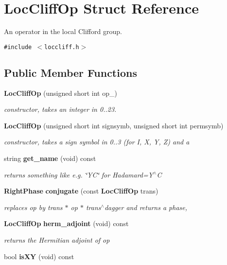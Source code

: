 \section{Loc\-Cliff\-Op Struct Reference}
\label{structLocCliffOp}
An operator in the local Clifford group.  


{\tt \#include $<$loccliff.h$>$}

\subsection*{Public Member Functions}
\begin{CompactItemize}
\item 
{\bf Loc\-Cliff\-Op} (unsigned short int op\_\-)\label{structLocCliffOp_a0}

\begin{CompactList}\small\item\em constructor, takes an integer in 0..23. \item\end{CompactList}\item 
{\bf Loc\-Cliff\-Op} (unsigned short int signsymb, unsigned short int permsymb)
\begin{CompactList}\small\item\em constructor, takes a sign symbol in 0..3 (for I, X, Y, Z) and a \item\end{CompactList}\item 
string {\bf get\_\-name} (void) const \label{structLocCliffOp_a2}

\begin{CompactList}\small\item\em returns something like e.g. \char`\"{}YC\char`\"{} for Hadamard=Y$^\wedge$C \item\end{CompactList}\item 
{\bf Right\-Phase} {\bf conjugate} (const  {\bf Loc\-Cliff\-Op} trans)
\begin{CompactList}\small\item\em replaces op by trans $\ast$ op $\ast$ trans$^\wedge$dagger and returns a phase, \item\end{CompactList}\item 
{\bf Loc\-Cliff\-Op} {\bf herm\_\-adjoint} (void) const \label{structLocCliffOp_a4}

\begin{CompactList}\small\item\em returns the Hermitian adjoint of op \item\end{CompactList}\item 
bool {\bf is\-XY} (void) const \label{structLocCliffOp_a5}


\end{CompactItemize}
